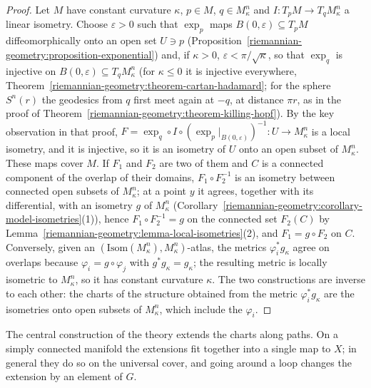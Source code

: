 \begin{proof}
Let $M$ have constant curvature $\kappa$, $p \in M$, $q \in M^n_\kappa$ and $I \colon T_pM \to T_qM^n_\kappa$ a linear isometry. Choose $\varepsilon > 0$ such that $\exp_p$ maps $B(0, \varepsilon) \subseteq T_pM$ diffeomorphically onto an open set
$U \ni p$ (Proposition~\ref{riemannian-geometry:proposition-exponential}) and, if $\kappa > 0$, $\varepsilon < \pi/\sqrt\kappa$, so that $\exp_q$ is injective on $B(0, \varepsilon) \subseteq T_qM^n_\kappa$ (for $\kappa \leq 0$ it is injective
everywhere, Theorem~\ref{riemannian-geometry:theorem-cartan-hadamard}; for the sphere $S^n(r)$ the geodesics from $q$ first meet again at $-q$, at distance $\pi r$, as in the proof of
Theorem~\ref{riemannian-geometry:theorem-killing-hopf}). By the key observation in that proof, $F = \exp_q \circ I \circ (\exp_p|_{B(0, \varepsilon)})^{-1} \colon U \to M^n_\kappa$ is a local isometry, and it is injective, so it is an isometry
of $U$ onto an open subset of $M^n_\kappa$. These maps cover $M$. If $F_1$ and $F_2$ are two of them and $C$ is a connected component of the overlap of their domains, $F_1 \circ F_2^{-1}$ is an isometry between connected open
subsets of $M^n_\kappa$; at a point $y$ it agrees, together with its differential, with an isometry $g$ of $M^n_\kappa$ (Corollary~\ref{riemannian-geometry:corollary-model-isometries}(1)), hence $F_1 \circ F_2^{-1} = g$ on the connected
set $F_2(C)$ by Lemma~\ref{riemannian-geometry:lemma-local-isometries}(2), and $F_1 = g \circ F_2$ on $C$. Conversely, given an $(\mathrm{Isom}(M^n_\kappa), M^n_\kappa)$-atlas, the metrics $\varphi_i^*g_\kappa$ agree on overlaps because
$\varphi_i = g \circ \varphi_j$ with $g^*g_\kappa = g_\kappa$; the resulting metric is locally isometric to $M^n_\kappa$, so it has constant curvature $\kappa$. The two constructions are inverse to each other: the charts of the
structure obtained from the metric $\varphi_i^*g_\kappa$ are the isometries onto open subsets of $M^n_\kappa$, which include the $\varphi_i$.
\end{proof}

The central construction of the theory extends the charts along paths. On a simply connected manifold the extensions fit together into a single map to $X$; in general they do so on the universal cover,
and going around a loop changes the extension by an element of $G$.

